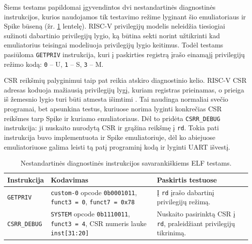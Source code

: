 Šiems testams papildomai įgyvendintos dvi nestandartinės diagnostinės instrukcijos, kurios naudojamos tik testavimo režime lyginant šio emuliatoriaus ir Spike būseną (žr. \ref{table:debug_instructions} lentelę). RISC-V privilegijų modelis neleidžia tiesiogiai sužinoti dabartinio privilegijų lygio, ką būtina sekti norint užtikrinti kad emuliatorius teisingai modeliuoja privilegijų lygio keitimus. Todėl testams pasiūloma \texttt{GETPRIV} instrukcija, kuri į paskirties registrą įrašo einamąjį privilegijų režimo kodą: \texttt{0} -- U, \texttt{1} -- S, \texttt{3} -- M.

CSR reikšmių palyginimui taip pat reikia atskiro diagnostinio kelio. RISC-V CSR adresas koduoja mažiausią privilegijų lygį, kuriam registras prieinamas, o prieiga iš žemesnio lygio turi būti atmesta išimtimi \cite[p.~13]{riscv-privileged-20260120}. Tai naudinga normaliai svečio programai, bet apsunkina testus, kuriuose norima lyginti konkrečias CSR reikšmes tarp Spike ir kuriamo emuliatoriaus. Dėl to pridėta \texttt{CSRR\_DEBUG} instrukcija: ji nuskaito nurodytą CSR ir grąžina reikšmę į \texttt{rd}. Tokia pati instrukcija buvo implementuota ir Spike emuliatoriuje, dėl ko abiejuose emuliatoriuose galima leisti tą patį programinį kodą ir lyginti UART išvestį.

\begin{table}[h]
    \centering
    \small
    \begin{tabular}{|l|p{}|p{}|}
        \hline
        \textbf{Instrukcija} & \textbf{Kodavimas} & \textbf{Paskirtis testuose} \\
        \hline
        \texttt{GETPRIV} & \texttt{custom-0} opcode \texttt{0b0001011}, \texttt{funct3 = 0}, \texttt{funct7 = 0x78} & Į \texttt{rd} įrašo dabartinį privilegijų režimą. \\
        \hline
        \texttt{CSRR\_DEBUG} & \texttt{SYSTEM} opcode \texttt{0b1110011}, \texttt{funct3 = 4}, CSR numeris lauke \texttt{inst[31:20]} & Nuskaito pasirinktą CSR į \texttt{rd}, praleidžiant privilegijų tikrinimą. \\
        \hline
    \end{tabular}
    \caption{Nestandartinės diagnostinės instrukcijos savarankiškiems ELF testams.}
    \label{table:debug_instructions}
\end{table}
